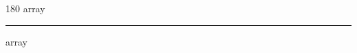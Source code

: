 
\begin{frame}
\begin{center}
\begin{turn}{180}
{\fontsize{2.5cm}{1em}\selectfont array}
\end{turn}
\vspace{1em}\par  
\hrule
\vspace{1em}\par  
{\fontsize{2.5cm}{1em}\selectfont array}
\end{center}
\end{frame}
